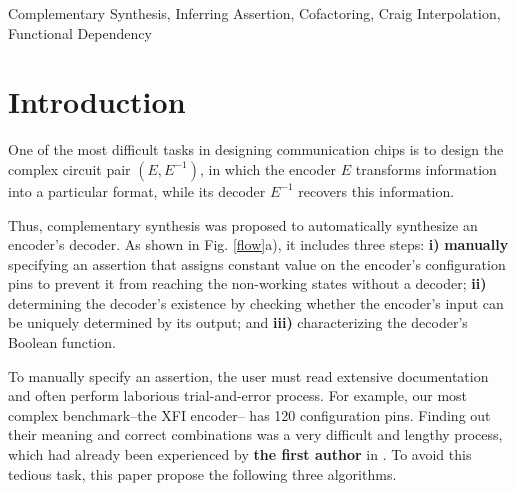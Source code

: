 \documentclass[journal]{IEEEtran}
\begin{document}
\begin{IEEEkeywords}
Complementary Synthesis, Inferring Assertion, Cofactoring, Craig Interpolation, Functional Dependency
\end{IEEEkeywords}






%
\IEEEpeerreviewmaketitle


\newtheorem{definition11}{\textbf{Definition}}
\newtheorem{lemma}{\textbf{Lemma}}
\newtheorem{theorem}{\textbf{Theorem}}
\newtheorem{proposition}{\textbf{Proposition}}

\section{Introduction}\label{sec_intro}

One of the most difficult tasks in designing communication chips
is to design the complex circuit pair $(E,E^{-1})$,
in which the encoder $E$ transforms information into a particular format,
while its decoder $E^{-1}$ recovers this information.

Thus,
complementary synthesis \cite{ShengYuShen:iccad09} was proposed
to automatically synthesize an encoder's decoder.
As shown in Fig. \ref{flow}a),
it includes three steps:
\textbf{i)} \textbf{manually} specifying an assertion that assigns constant value on the encoder's configuration pins
to prevent it from reaching the non-working states without a decoder;
\textbf{ii)}
determining the decoder's existence by checking whether the encoder's input can be uniquely determined by its output;
and
\textbf{iii)}
characterizing the decoder's Boolean function.

To manually specify an assertion,
the user must read extensive documentation
and often perform laborious trial-and-error process.
For example,
our most complex benchmark--the XFI encoder--
has 120 configuration pins.
Finding out their meaning and correct combinations was a very difficult and lengthy process,
which had already been experienced by \textbf{the first author} in \cite{ShengYuShen:iccad09}.
To avoid this tedious task,
this paper propose the following three algorithms.
\end{document}
